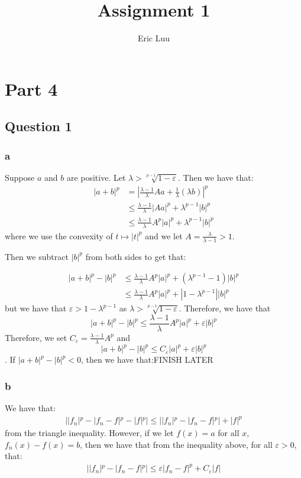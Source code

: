 \documentclass{article}
\title{Assignment 1}
\author{Eric Luu}
\theoremstyle{definition}
\numberwithin{theorem}{section}
\numberwithin{equation}{section}
\begin{document}
\maketitle
\section*{Part 4}
\subsection*{Question 1}
\subsubsection*{a}
Suppose $a$ and $b$ are positive. Let $\lambda > \sqrt[p-1]{1- \varepsilon}$. Then we have that:
\begin{align*}
	| a + b |^p &= | \frac{\lambda- 1}{\lambda} A a + \frac{1}{\lambda}(\lambda b) |^p\\
	&\leq \frac{\lambda- 1}{\lambda} |A a |^p + \lambda^{p-1} |b|^p\\
	&\leq \frac{\lambda- 1}{\lambda} A^p |a|^p + \lambda^{p-1} |b|^p
\end{align*}
where we use the convexity of $t \mapsto |t|^p$ and we let
$A = \frac{\lambda}{\lambda - 1} > 1$. 

Then we subtract $|b|^p$ from both sides to get that:

\begin{align*}
	| a + b |^p - |b|^p &\leq \frac{\lambda- 1}{\lambda} A^p |a|^p + (\lambda^{p-1} - 1) |b|^p\\
	&\leq \frac{\lambda- 1}{\lambda} A^p |a|^p + |1 - \lambda^{p-1}| |b|^p
\end{align*}
but we have that $\varepsilon >1 - \lambda^{p-1}$ as $\lambda > \sqrt[p-1]{1- \varepsilon}$. Therefore, we have that 
\begin{equation*}
	| a + b |^p - |b|^p \leq \frac{\lambda- 1}{\lambda} A^p |a|^p + 
	\varepsilon|b|^p
\end{equation*}
Therefore, we set $C_\varepsilon = \frac{\lambda- 1}{\lambda} A^p $ and 
\begin{equation*}
	| a + b |^p - |b|^p \leq C_\varepsilon |a|^p + 
	\varepsilon|b|^p
\end{equation*}.
If $|a + b|^p - |b|^p < 0$, then we have that:FINISH LATER

\subsubsection*{b}
We have that:
\begin{align*}
	| |f_n|^p - |f_n - f|^p - |f|^p | \leq  | |f_n|^p - |f_n - f|^p | + |f|^p 
\end{align*}
from the triangle inequality.
However, if we let $f(x) = a$ for all $x$, $f_n(x) - f(x) = b$, then we have that from the inequality above, for all $\varepsilon > 0$, that:
\begin{align*}
	 | |f_n|^p - |f_n - f|^p| \leq \varepsilon |f_n - f|^p + C_\varepsilon |f|
\end{align*}
\end{document}
